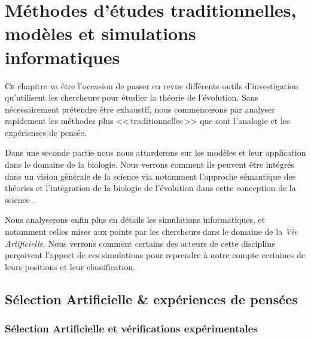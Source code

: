 \chapter{Méthodes d'études traditionnelles, modèles et simulations informatiques}\label{ch:methode}

\lettrine[lines=2]{C}{e} chapitre va être l'occasion de passer en revue différents outils d'investigation qu'utilisent les chercheurs pour étudier la théorie de l'évolution. Sans nécessairement prétendre être exhaustif, nous commencerons par analyser rapidement les méthodes plus <<\,traditionnelles\,>> que sont l'analogie et les expériences de pensée.

Dans une seconde partie nous nous attarderons sur les modèles et leur application dans le domaine de la biologie. Nous verrons comment ils peuvent être intégrés dans un vision générale de la science via notamment l'approche sémantique des théories \citep{vanfraassen1980thescientificimage,suppe1989thesemanticconceptionoftheoriesandscientificrealism} et l'intégration de la biologie de l'évolution dans cette conception de la science \citep{thompson1987adefenceofthesemanticconceptionofevolutionarytheory,lloyd1984asmanticapproachtothestructureofpopulationgenetics,beatty1980whatswrongwithreceivedwiew}.  

Nous analyserons enfin plus en détails les simulations informatiques, et notamment celles mises aux points par les chercheurs dans le domaine de la \emph{Vie Artificielle}. Nous verrons comment certains des acteurs de cette discipline \citep{barandiaran06alifemodelsasepistemicartefacts} perçoivent l'apport de ces simulations pour reprendre à notre compte certaines de leurs positions et leur classification.


\section{Sélection Artificielle \& expériences de pensées }
\subsection{Sélection Artificielle et vérifications expérimentales}\label{sec:cmpdr:sa}

